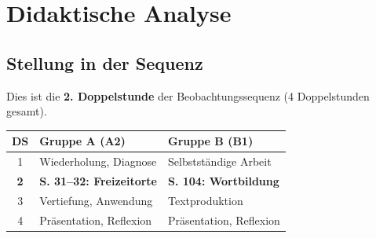 \documentclass[11pt,a4paper]{article}
\begin{document}
\section{Didaktische Analyse}

\subsection{Stellung in der Sequenz}
Dies ist die \textbf{2. Doppelstunde} der Beobachtungssequenz (4 Doppelstunden gesamt).

\begin{tabular}{|c|l|l|}
\hline
\textbf{DS} & \textbf{Gruppe A (A2)} & \textbf{Gruppe B (B1)} \\
\hline
1 & Wiederholung, Diagnose & Selbstständige Arbeit \\
\hline
\textbf{2} & \textbf{S. 31--32: Freizeitorte} & \textbf{S. 104: Wortbildung} \\
\hline
3 & Vertiefung, Anwendung & Textproduktion \\
\hline
4 & Präsentation, Reflexion & Präsentation, Reflexion \\
\hline
\end{tabular}
\end{document}
